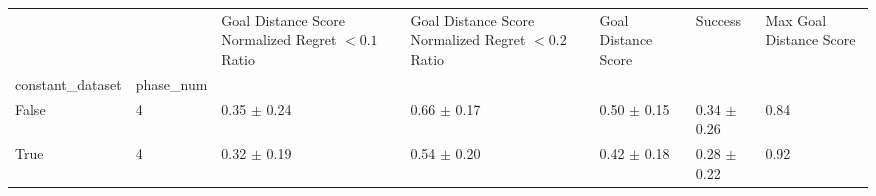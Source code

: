 \begin{tabular}{lllllll}
\toprule
 &  & Goal Distance Score Normalized Regret $< 0.1$ Ratio & Goal Distance Score Normalized Regret $< 0.2$ Ratio & Goal Distance Score & Success & Max Goal Distance Score \\
constant_dataset & phase_num &  &  &  &  &  \\
\midrule
False & 4 & 0.35 $\pm$ 0.24 & 0.66 $\pm$ 0.17 & 0.50 $\pm$ 0.15 & 0.34 $\pm$ 0.26 & 0.84 \\
\cline{1-7}
True & 4 & 0.32 $\pm$ 0.19 & 0.54 $\pm$ 0.20 & 0.42 $\pm$ 0.18 & 0.28 $\pm$ 0.22 & 0.92 \\
\cline{1-7}
\bottomrule
\end{tabular}
